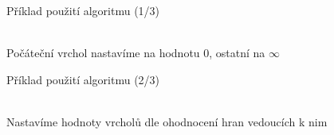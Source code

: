 \documentclass{beamer}
\begin{document}
\begin{frame}{Příklad použití algoritmu (1/3)}
    \begin{center}
    \\[1em]
    Počáteční vrchol nastavíme na hodnotu 0, ostatní na $\infty$
    \end{center}
\end{frame}

\begin{frame}{Příklad použití algoritmu (2/3)}
    \begin{center}
    \\[1em]
    Nastavíme hodnoty vrcholů dle ohodnocení hran vedoucích k nim
    \end{center}
\end{frame}
\end{document}
